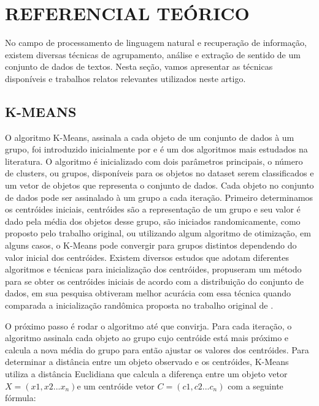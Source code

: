 \documentclass[12pt,a4paper]{article}
\begin{document}
  \section{REFERENCIAL TEÓRICO}
  No campo de processamento de linguagem natural e recuperação de informação, existem diversas técnicas de agrupamento, análise e extração de sentido de um conjunto de dados de textos. Nesta seção, vamos apresentar as técnicas disponíveis e trabalhos relatos relevantes utilizados neste artigo.
  
  
  
  \subsection{K-MEANS}
  O algoritmo K-Means, assinala a cada objeto de um conjunto de dados à um grupo, foi introduzido inicialmente por  e é um dos algoritmos mais estudados na literatura. O algoritmo é inicializado com dois parâmetros principais, o número de clusters, ou grupos, disponíveis para os objetos no dataset serem classificados e um vetor de objetos que representa o conjunto de dados. Cada objeto no conjunto de dados pode ser assinalado à um grupo a cada iteração. Primeiro determinamos os centróides iniciais, centróides são a representação de um grupo e seu valor é dado pela média dos objetos desse grupo, são iniciados randomicamente, como proposto  pelo trabalho original, ou utilizando algum algoritmo de otimização, em alguns casos, o K-Means pode convergir para grupos distintos dependendo do valor inicial dos centróides. Existem diversos estudos que adotam diferentes algoritmos e técnicas para inicialização dos centróides,  propuseram um método  para se obter os centróides iniciais de acordo com a distribuição do conjunto de dados, em sua pesquisa obtiveram melhor acurácia com essa técnica quando comparada a inicialização randômica proposta no trabalho original de .
  
  O próximo passo é rodar o algoritmo até que convirja. Para cada iteração, o algoritmo assinala cada objeto ao grupo cujo centróide está mais próximo e calcula a nova média do grupo para então ajustar os valores dos centróides. Para determinar a distância entre um objeto observado e os centróides, K-Means utiliza a distância Euclidiana que calcula a diferença entre um objeto vetor \(X=(x1, x2... x_n)\)e um centróide vetor \(C=(c1, c2... c_n)\) com a seguinte fórmula: 
  
\end{document}
